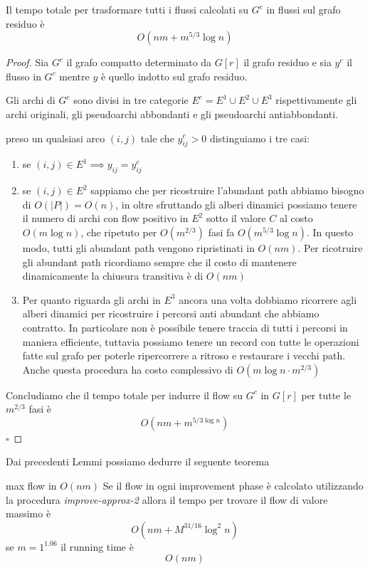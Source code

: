 \documentclass[a4paper, 11pt]{report}
\newcommand*{\QED}{\null\nobreak\hfill\ensuremath{\square}}%
\begin{document}
\begin{lemma}{}{}
    Il tempo totale per trasformare tutti i flussi calcolati su $G^c$ in flussi sul grafo residuo è 
    \[O(nm+ m^{5/3}\log n)\]

\end{lemma}
\begin{proof}
    Sia $G^c$ il grafo compatto determinato da $G[r]$ il grafo residuo e sia $y^c$ il flusso in  $G^c$ mentre $y$ è quello indotto sul grafo residuo.

    Gli archi di $G^c$ sono divisi in tre categorie $E^c = E^1\cup E^2\cup E^3$ rispettivamente gli archi originali, gli pseudoarchi abbondanti e gli pseudoarchi antiabbondanti.

    preso un qualsiasi arco $(i,j)$ tale che $y^c_{ij}> 0$ distinguiamo i tre casi:
    \begin{enumerate}
        \item se $(i,j) \in E^1 \implies y_{ij} = y^c_{ij}$
        \item se $(i,j) \in E^2$ sappiamo che per ricostruire l'abundant path abbiamo bisogno di $O(|P|) = O(n)$, in oltre sfruttando gli alberi dinamici possiamo tenere il numero di archi con flow positivo in $E^2$ sotto il valore $C$ al costo $O(m\log n)$, che ripetuto per $O(m^{2/3})$ fasi fa $O(m^{5/3}\log n)$. In questo modo, tutti gli abundant path vengono ripristinati in $O(nm)$.
        Per ricotruire gli abundant path ricordiamo sempre che il costo di mantenere dinamicamente la chiusura transitiva è di $O(nm)$
        \item Per quanto riguarda gli archi in $E^3$ ancora una volta dobbiamo ricorrere agli alberi dinamici per ricostruire i percorsi anti abundant che abbiamo contratto. In particolare non è possibile tenere traccia di tutti i percorsi in maniera efficiente, tuttavia possiamo tenere un record con tutte le operazioni fatte sul grafo per poterle ripercorrere a ritroso e restaurare i vecchi path. Anche questa procedura ha costo complessivo di $O(m\log n\cdot m^{2/3})$ 
    \end{enumerate}
    Concludiamo che il tempo totale per indurre il flow su $G^c$ in $G[r]$ per tutte le $m^{2/3}$ fasi è 
    \[O(nm+m^{5/3\log n})\]\QED
\end{proof}

Dai precedenti Lemmi possiamo dedurre il seguente teorema
\begin{theo}{max flow in $O(nm)$}{}
    Se il flow in ogni improvement phase è calcolato utilizzando la procedura \textit{improve-approx-2} allora il tempo per trovare il flow di valore massimo è 
    \[O(nm+M^{31/16}\log^2n)\]
    se $m= 1^{1.06}$ il running time è
    \[O(nm)\]
\end{theo}
\end{document}
